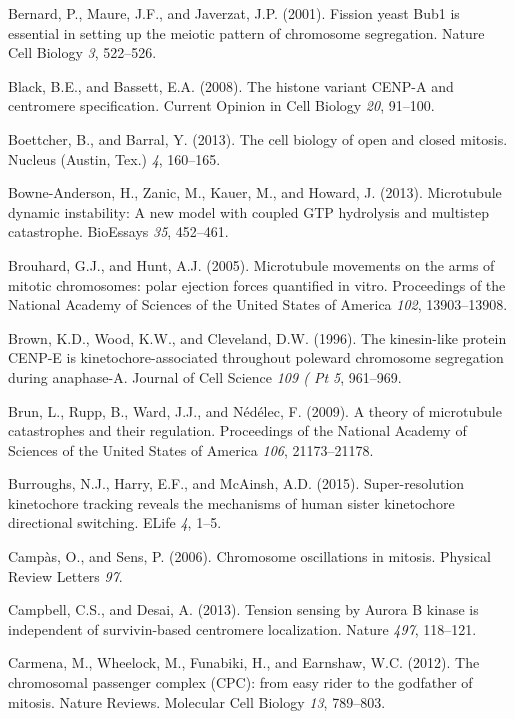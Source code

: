 \documentclass[12pt,a4paper,twoside,openright]{book}
\begin{document}
\hypertarget{ref-Bernard2001}{}
Bernard, P., Maure, J.F., and Javerzat, J.P. (2001). Fission yeast Bub1
is essential in setting up the meiotic pattern of chromosome
segregation. Nature Cell Biology \emph{3}, 522--526.

\hypertarget{ref-Black2008}{}
Black, B.E., and Bassett, E.A. (2008). The histone variant CENP-A and
centromere specification. Current Opinion in Cell Biology \emph{20},
91--100.

\hypertarget{ref-Boettcher2013}{}
Boettcher, B., and Barral, Y. (2013). The cell biology of open and
closed mitosis. Nucleus (Austin, Tex.) \emph{4}, 160--165.

\hypertarget{ref-Bowne-Anderson2013}{}
Bowne-Anderson, H., Zanic, M., Kauer, M., and Howard, J. (2013).
Microtubule dynamic instability: A new model with coupled GTP hydrolysis
and multistep catastrophe. BioEssays \emph{35}, 452--461.

\hypertarget{ref-Brouhard2005}{}
Brouhard, G.J., and Hunt, A.J. (2005). Microtubule movements on the arms
of mitotic chromosomes: polar ejection forces quantified in vitro.
Proceedings of the National Academy of Sciences of the United States of
America \emph{102}, 13903--13908.

\hypertarget{ref-Brown1996}{}
Brown, K.D., Wood, K.W., and Cleveland, D.W. (1996). The kinesin-like
protein CENP-E is kinetochore-associated throughout poleward chromosome
segregation during anaphase-A. Journal of Cell Science \emph{109 ( Pt
5}, 961--969.

\hypertarget{ref-Brun2009}{}
Brun, L., Rupp, B., Ward, J.J., and Nédélec, F. (2009). A theory of
microtubule catastrophes and their regulation. Proceedings of the
National Academy of Sciences of the United States of America \emph{106},
21173--21178.

\hypertarget{ref-Burroughs2015}{}
Burroughs, N.J., Harry, E.F., and McAinsh, A.D. (2015). Super-resolution
kinetochore tracking reveals the mechanisms of human sister kinetochore
directional switching. ELife \emph{4}, 1--5.

\hypertarget{ref-Campas2006}{}
Campàs, O., and Sens, P. (2006). Chromosome oscillations in mitosis.
Physical Review Letters \emph{97}.

\hypertarget{ref-Campbell2013a}{}
Campbell, C.S., and Desai, A. (2013). Tension sensing by Aurora B kinase
is independent of survivin-based centromere localization. Nature
\emph{497}, 118--121.

\hypertarget{ref-Carmena2012a}{}
Carmena, M., Wheelock, M., Funabiki, H., and Earnshaw, W.C. (2012). The
chromosomal passenger complex (CPC): from easy rider to the godfather of
mitosis. Nature Reviews. Molecular Cell Biology \emph{13}, 789--803.
\end{document}
